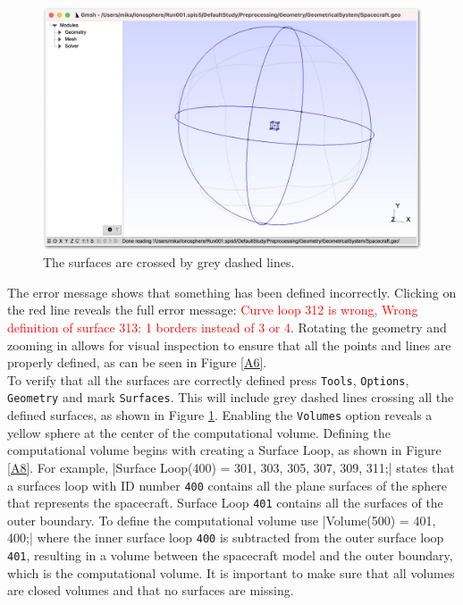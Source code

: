 \documentclass[a4paper, 12pt]{article}
\begin{document}
\begin{figure}[!ht]
    \centering
    \includegraphics[width=1\textwidth]{figA7.jpg}
    \caption{The surfaces are crossed by grey dashed lines.}
    \label{A7}
\end{figure}

The error message shows that something has been defined incorrectly. Clicking on the red line reveals the full error message: \textcolor{red}{Curve loop 312 is wrong, Wrong definition of surface 313: 1 borders instead of 3 or 4}. Rotating the geometry and zooming in allows for visual inspection to ensure that all the points and lines are properly defined, as can be seen in Figure \ref{A6}.\\

To verify that all the surfaces are correctly defined press \verb|Tools|, \verb|Options|, \verb|Geometry| and mark \verb|Surfaces|. This will include grey dashed lines crossing all the defined surfaces, as shown in Figure \ref{A7}. Enabling the \verb|Volumes| option reveals a yellow sphere at the center of the computational volume. Defining the computational volume begins with creating a Surface Loop, as shown in Figure \ref{A8}. For example, |Surface Loop(400) = {301, 303, 305, 307, 309, 311};| states that a surfaces loop with ID number \verb|400| contains all the plane surfaces of the sphere that represents the spacecraft. Surface Loop \verb|401| contains all the surfaces of the outer boundary. To define the computational volume use |Volume(500) = {401, 400};| where the inner surface loop \verb|400| is subtracted from the outer surface loop \verb|401|, resulting in a volume between the spacecraft model and the outer boundary, which is the computational volume. It is important to make sure that all volumes are closed volumes and that no surfaces are missing.\\
\end{document}
